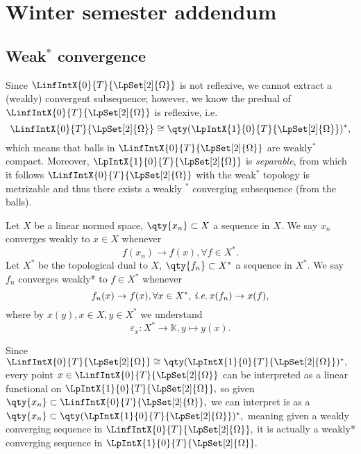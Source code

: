 
\section{Winter semester addendum}
\label{chap:addendum}

\subsection{Weak$^*$ convergence}
\label{sec:weakstarconv}
Since $\LinfIntX{0}{T}{\LpSet[2]{\Omega}}$ is not reflexive, we cannot extract a (weakly) convergent subsequence; however, we know the predual of $\LinfIntX{0}{T}{\LpSet[2]{\Omega}}$ is reflexive, i.e.
\[
	\LinfIntX{0}{T}{\LpSet[2]{\Omega}} \cong \qty(\LpIntX{1}{0}{T}{\LpSet[2]{\Omega}})^{*},
\]
which means that balls in $\LinfIntX{0}{T}{\LpSet[2]{\Omega}}$ are weakly$^{*}$ compact. Moreover, $\LpIntX{1}{0}{T}{\LpSet[2]{\Omega}}$ is \textit{separable}, from which it follows $\LinfIntX{0}{T}{\LpSet[2]{\Omega}}$ with the weak$^{*}$ topology is metrizable and thus there exists a weakly $^{*}$ converging subsequence (from the balls).

\begin{example}
	Let $X$ be a linear normed space, $\qty{x_n} \subset X$ a sequence in $X$. We say $x_n$ converges weakly to $x \in X$ whenever
	\[
		f(x_n) \to f(x), \forall f \in X^{*}.
	\]
	Let $X^{*}$ be the topological dual to $X$, $\qty{f_n} \subset X^{*}$ a sequence in $X^{*}$. We say $f_n$ converges weakly* to $f \in X^{*}$ whenever
	\[
		f_n(x) \to f(x), \forall x \in X^{*}, \, \text{\textit{i.e.}} \, x(f_n) \to x(f),
	\]
	where by $x(y), x \in X, y \in X^{*}$ we understand
	\[
		\varepsilon_x : X^{*} \to \mathbb{K}, y \mapsto y(x).
	\]

	Since $\LinfIntX{0}{T}{\LpSet[2]{\Omega}} \cong \qty(\LpIntX{1}{0}{T}{\LpSet[2]{\Omega}})^{*} ,$ every point $x \in \LinfIntX{0}{T}{\LpSet[2]{\Omega}}$ can be interpreted as a linear functional on $\LpIntX{1}{0}{T}{\LpSet[2]{\Omega}},$ so given $\qty{x_n} \subset \LinfIntX{0}{T}{\LpSet[2]{\Omega}},$ we can interpret is as a $\qty{x_n} \subset \qty(\LpIntX{1}{0}{T}{\LpSet[2]{\Omega}})^{*},$ meaning given a weakly converging sequence in $\LinfIntX{0}{T}{\LpSet[2]{\Omega}},$ it is actually a weakly* converging sequence in $\LpIntX{1}{0}{T}{\LpSet[2]{\Omega}}.$
\end{example}


